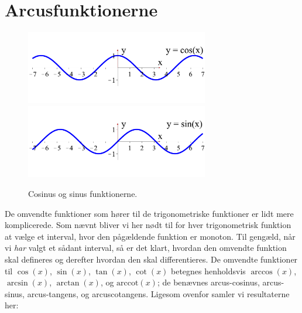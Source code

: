
\section{Arcusfunktionerne} \label{tn14.secArcus}

\begin{figure}[h]
\centerline{\includegraphics[width=80mm]{FIGS/plotcos.pdf} \quad \includegraphics[width=80mm]{FIGS/plotsin.pdf}}
\begin{center}
\caption{Cosinus og sinus funktionerne.} \label{tn14.figplotcossin}
\end{center}
\end{figure}


De omvendte funktioner som hører til de trigonometriske funktioner er lidt mere komplicerede. Som nævnt bliver vi her nødt til for hver trigonometrisk funktion at vælge et interval, hvor den pågældende funktion er monoton. Til gengæld, når vi \emph{har} valgt et sådant interval, så er det klart, hvordan den omvendte funktion skal defineres og derefter hvordan den skal differentieres. De omvendte funktioner til $\cos(x)$, $\sin(x)$, $\tan(x)$, $\cot(x)$ betegnes henholdsvis $\arccos(x)$, $\arcsin(x)$, $\arctan(x)$, og $\textrm{arccot}(x)$; de benævnes arcus-cosinus, arcus-sinus, arcus-tangens, og arcuscotangens. Ligesom ovenfor samler vi resultaterne her:

